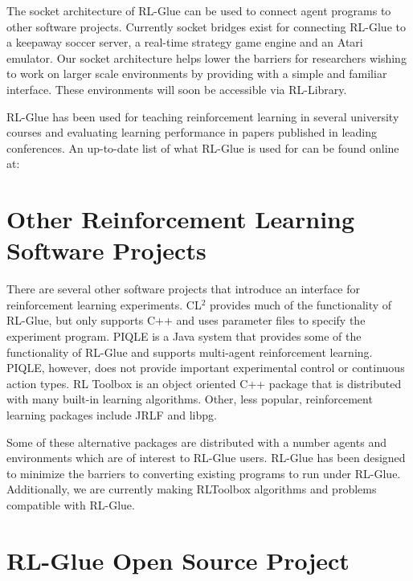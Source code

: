 \documentclass[twopage,11pt]{article}
\begin{document}
The socket architecture of RL-Glue can be used to connect agent programs to other software projects. Currently socket bridges exist for connecting RL-Glue to a keepaway soccer server, a real-time strategy game engine and an Atari emulator. Our socket architecture helps lower the barriers for researchers wishing to work on larger scale environments by providing with a simple and familiar interface. These environments will soon be accessible via RL-Library. 

RL-Glue has been used for teaching reinforcement learning in several university courses and evaluating learning performance in papers published in leading conferences. An up-to-date list of what RL-Glue is used for can be found online at:%




\section{Other Reinforcement Learning Software Projects}

There are several other software projects that introduce an interface for reinforcement learning experiments. CL$^2$ provides much of the functionality of RL-Glue, but only supports C++ and uses parameter files to specify the experiment program. PIQLE is a Java system that provides some of the functionality of RL-Glue and supports multi-agent reinforcement learning. PIQLE, however, does not provide important experimental control or continuous action types. RL Toolbox is an object oriented C++ package that is distributed with many built-in learning algorithms. Other, less popular, reinforcement learning packages include JRLF and libpg. 

Some of these alternative packages are distributed with a number agents and environments which are of interest to RL-Glue users. RL-Glue has been designed to minimize the barriers to converting existing programs to run under RL-Glue. Additionally, we are currently making RLToolbox algorithms and problems compatible with RL-Glue. 






 
 
 
\section{RL-Glue Open Source Project}
\end{document}
